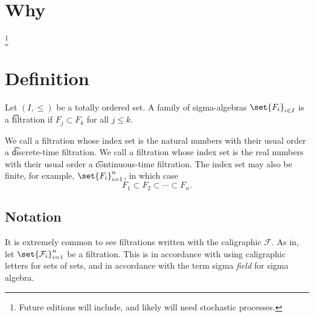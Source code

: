 
\section*{Why}
\footnote{Future editions will include, and likely will need stochastic processes.}
\section*{Definition}

Let $(I, \leq)$ be a totally ordered set.
A family of sigma-algebras $\set{F_i}_{i \in I}$ is a \t{filtration} if $F_{j} \subset F_{k}$ for all $j \leq k$.

We call a filtration whose index set is the natural numbers with their usual order a \t{discrete-time filtration}.
We call a filtration whose index set is the real numbers with their usual order a \t{continuous-time filtration}.
The index set may also be finite, for example, $\set{F_i}_{i = 1}^{n}$, in which case
\[
F_1 \subset F_2 \subset \cdots \subset F_n.
\]

\subsection*{Notation}

It is extremely common to see filtrations written with the caligraphic $\mathcal{F} $.
As in, let $\set{\mathcal{F} _{i}}_{i=1}^{n}$ be a filtration.
This is in accordance with using caligraphic letters for sets of sets, and in accordance with the term sigma \textit{field} for sigma algebra.

\blankpage